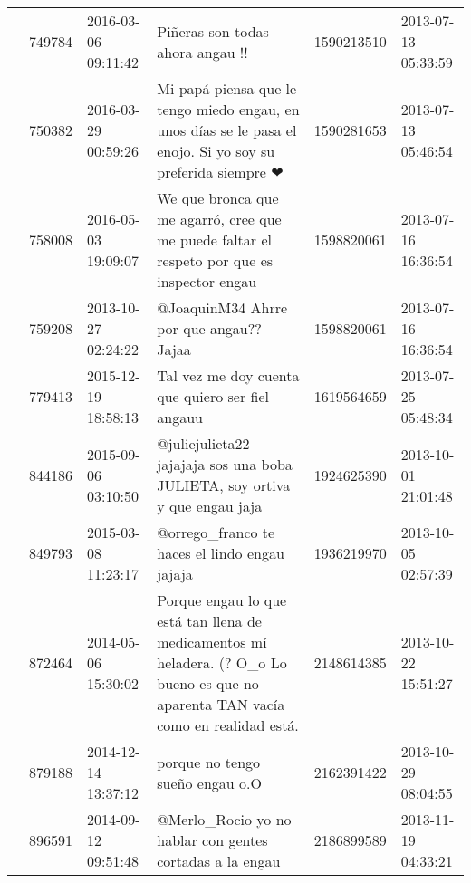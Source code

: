 \begin{tabular}{llllrl}
           & 749784  & 2016-03-06 09:11:42 &                                                                                                             Piñeras son todas ahora angau !! &  1590213510 & 2013-07-13 05:33:59 \\
           & 750382  & 2016-03-29 00:59:26 &                                  Mi papá piensa que le tengo miedo engau, en unos días se le pasa el enojo. Si yo soy su preferida siempre ❤ &  1590281653 & 2013-07-13 05:46:54 \\
           & 758008  & 2016-05-03 19:09:07 &                                                  We que bronca que me agarró, cree que me puede faltar el respeto por que es inspector engau &  1598820061 & 2013-07-16 16:36:54 \\
           & 759208  & 2013-10-27 02:24:22 &                                                                                                      @JoaquinM34 Ahrre por que angau?? Jajaa &  1598820061 & 2013-07-16 16:36:54 \\
           & 779413  & 2015-12-19 18:58:13 &                                                                                           Tal vez me doy cuenta que quiero ser fiel 🎵 angauu &  1619564659 & 2013-07-25 05:48:34 \\
           & 844186  & 2015-09-06 03:10:50 &                                                                   @juliejulieta22 jajajaja sos una boba JULIETA, soy ortiva y que engau jaja &  1924625390 & 2013-10-01 21:01:48 \\
           & 849793  & 2015-03-08 11:23:17 &                                                                                                @orrego\_franco te haces el lindo engau jajaja &  1936219970 & 2013-10-05 02:57:39 \\
           & 872464  & 2014-05-06 15:30:02 &          Porque engau lo que está tan llena de medicamentos mí heladera. (? O\_o Lo bueno es que no aparenta TAN vacía como en realidad está. &  2148614385 & 2013-10-22 15:51:27 \\
           & 879188  & 2014-12-14 13:37:12 &                                                                                                              porque no tengo sueño engau o.O &  2162391422 & 2013-10-29 08:04:55 \\
           & 896591  & 2014-09-12 09:51:48 &                                                                                     @Merlo\_Rocio yo no hablar con gentes cortadas a la engau &  2186899589 & 2013-11-19 04:33:21 \\

\end{tabular}
